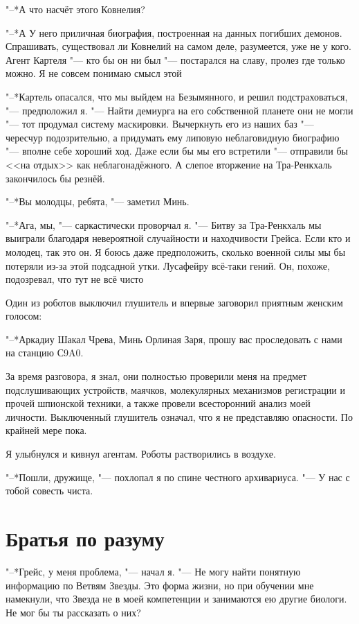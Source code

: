 "--*А что насчёт этого Ковнелия?

"--*А\ldotst
У него приличная биография, построенная на данных погибших демонов.
Спрашивать, существовал ли Ковнелий на самом деле, разумеется, уже не у кого.
Агент Картеля "--- кто бы он ни был "--- постарался на славу, пролез где только можно.
Я не совсем понимаю смысл этой\ldotst

"--*Картель опасался, что мы выйдем на Безымянного, и решил подстраховаться, "--- предположил я.
"--- Найти демиурга на его собственной планете они не могли "--- тот продумал систему маскировки.
Вычеркнуть его из наших баз "--- чересчур подозрительно, а придумать ему липовую неблаговидную биографию "--- вполне себе хороший ход.
Даже если бы мы его встретили "--- отправили бы <<на отдых>> как неблагонадёжного.
А слепое вторжение на Тра-Ренкхаль закончилось бы резнёй.

"--*Вы молодцы, ребята, "--- заметил Минь.

"--*Ага, мы, "--- саркастически проворчал я.
"--- Битву за Тра-Ренкхаль мы выиграли благодаря невероятной случайности и находчивости Грейса.
Если кто и молодец, так это он.
Я боюсь даже предположить, сколько военной силы мы бы потеряли из-за этой подсадной утки.
Лусафейру всё-таки гений.
Он, похоже, подозревал, что тут не всё чисто\ldotst

Один из роботов выключил глушитель и впервые заговорил приятным женским голосом:

"--*Аркадиу Шакал Чрева, Минь Орлиная Заря, прошу вас проследовать с нами на станцию С9A0.

За время разговора, я знал, они полностью проверили меня на предмет подслушивающих устройств, маячков, молекулярных механизмов регистрации и прочей шпионской техники, а также провели всесторонний анализ моей личности.
Выключенный глушитель означал, что я не представляю опасности.
По крайней мере пока.

Я улыбнулся и кивнул агентам.
Роботы растворились в воздухе.

"--*Пошли, дружище, "--- похлопал я по спине честного архивариуса.
"--- У нас с тобой совесть чиста.

\section{Братья по разуму}

"--*Грейс, у меня проблема, "--- начал я.
"--- Не могу найти понятную информацию по Ветвям Звезды.
Это форма жизни, но при обучении мне намекнули, что Звезда не в моей компетенции и занимаются ею другие биологи.
Не мог бы ты рассказать о них?

